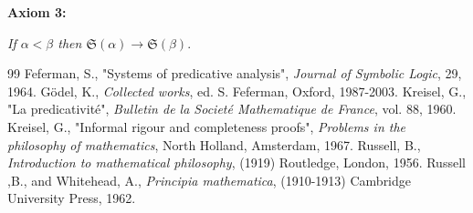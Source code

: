 \documentclass[12pt]{article}
\begin{document}
\quad \textbf{Axiom 3:} 

\begin{center}
\emph{If $\alpha < \beta$ then $\mathfrak{S} (\alpha) \rightarrow \mathfrak{S} (\beta).$}  
\end{center}

\begin{thebibliography} {99}
 Feferman, S., "Systems of predicative analysis", \emph{Journal of Symbolic Logic}, 29, 1964.
 G\"{o}del, K., \emph{Collected works}, ed. S. Feferman, Oxford, 1987-2003.
 Kreisel, G., "La predicativit\'{e}", \emph{Bulletin de la Societ\'{e} Mathematique de France}, vol. 88, 1960.
 Kreisel, G., "Informal rigour and completeness proofs", \emph{Problems in the philosophy of mathematics}, North Holland, Amsterdam, 1967.
 Russell, B., \emph{Introduction to mathematical philosophy}, (1919) Routledge, London, 1956.
 Russell ,B., and Whitehead, A., \emph{Principia mathematica}, (1910-1913) Cambridge University Press, 1962.
\end{thebibliography}
\end{document}
